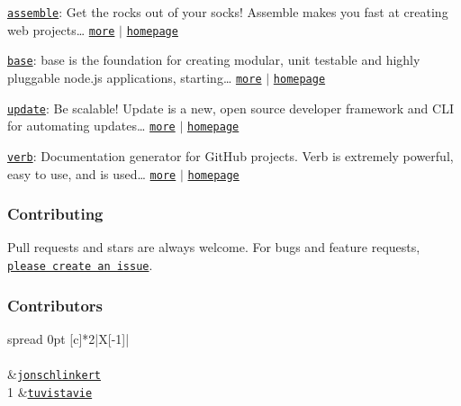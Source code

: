 \begin{DoxyItemize}
\item \href{https://www.npmjs.com/package/assemble}{\tt assemble}\+: Get the rocks out of your socks! Assemble makes you fast at creating web projects… \href{https://github.com/assemble/assemble}{\tt more} $\vert$ \href{https://github.com/assemble/assemble}{\tt homepage}
\item \href{https://www.npmjs.com/package/base}{\tt base}\+: base is the foundation for creating modular, unit testable and highly pluggable node.\+js applications, starting… \href{https://github.com/node-base/base}{\tt more} $\vert$ \href{https://github.com/node-base/base}{\tt homepage}
\item \href{https://www.npmjs.com/package/update}{\tt update}\+: Be scalable! Update is a new, open source developer framework and C\+LI for automating updates… \href{https://github.com/update/update}{\tt more} $\vert$ \href{https://github.com/update/update}{\tt homepage}
\item \href{https://www.npmjs.com/package/verb}{\tt verb}\+: Documentation generator for Git\+Hub projects. Verb is extremely powerful, easy to use, and is used… \href{https://github.com/verbose/verb}{\tt more} $\vert$ \href{https://github.com/verbose/verb}{\tt homepage}
\end{DoxyItemize}

\subsubsection*{Contributing}

Pull requests and stars are always welcome. For bugs and feature requests, \href{../../issues/new}{\tt please create an issue}.

\subsubsection*{Contributors}

\tabulinesep=1mm
\begin{longtabu} spread 0pt [c]{*{2}{|X[-1]}|}
\hline
\rowcolor{\tableheadbgcolor}\\
\endfirsthead
\hline
\endfoot
\hline
\rowcolor{\tableheadbgcolor}\\
  &\href{https://github.com/jonschlinkert}{\tt jonschlinkert}   \\
1  &\href{https://github.com/tuvistavie}{\tt tuvistavie}   \\
\end{longtabu}


